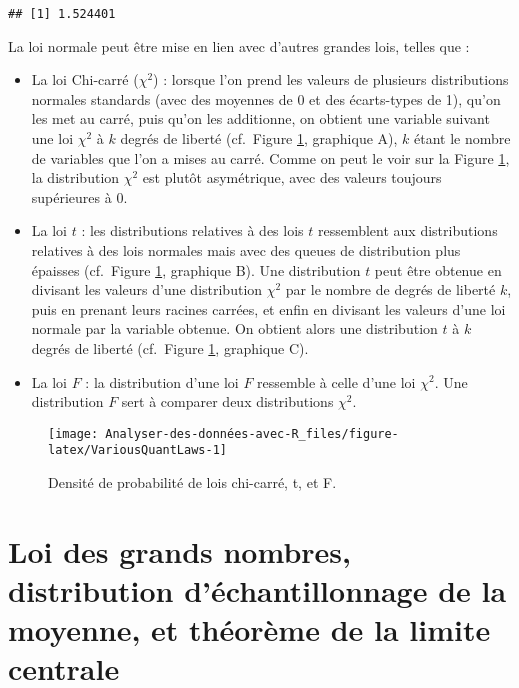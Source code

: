 \documentclass[
  french,
]{book}
\begin{document}
\begin{verbatim}
## [1] 1.524401
\end{verbatim}

La loi normale peut être mise en lien avec d'autres grandes lois, telles que :

\begin{itemize}
\item
  La loi Chi-carré (\(\chi^2\)) : lorsque l'on prend les valeurs de plusieurs distributions normales standards (avec des moyennes de 0 et des écarts-types de 1), qu'on les met au carré, puis qu'on les additionne, on obtient une variable suivant une loi \(\chi^2\) à \(k\) degrés de liberté (cf.~Figure \ref{fig:VariousQuantLaws}, graphique A), \(k\) étant le nombre de variables que l'on a mises au carré. Comme on peut le voir sur la Figure \ref{fig:VariousQuantLaws}, la distribution \(\chi^2\) est plutôt asymétrique, avec des valeurs toujours supérieures à 0.
\item
  La loi \(t\) : les distributions relatives à des lois \(t\) ressemblent aux distributions relatives à des lois normales mais avec des queues de distribution plus épaisses (cf.~Figure \ref{fig:VariousQuantLaws}, graphique B). Une distribution \(t\) peut être obtenue en divisant les valeurs d'une distribution \(\chi^2\) par le nombre de degrés de liberté \(k\), puis en prenant leurs racines carrées, et enfin en divisant les valeurs d'une loi normale par la variable obtenue. On obtient alors une distribution \(t\) à \(k\) degrés de liberté (cf.~Figure \ref{fig:VariousQuantLaws}, graphique C).
\item
  La loi \(F\) : la distribution d'une loi \(F\) ressemble à celle d'une loi \(\chi^2\). Une distribution \(F\) sert à comparer deux distributions \(\chi^2\).
\end{itemize}

\begin{figure}

{\centering \texttt{[image: Analyser-des-données-avec-R\_files/figure-latex/VariousQuantLaws-1]} 

}

\caption{Densité de probabilité de lois chi-carré, t, et F.}\label{fig:VariousQuantLaws}
\end{figure}

\hypertarget{loi-des-grands-nombres-distribution-duxe9chantillonnage-de-la-moyenne-et-thuxe9oruxe8me-de-la-limite-centrale}{%
\section{Loi des grands nombres, distribution d'échantillonnage de la moyenne, et théorème de la limite centrale}\label{loi-des-grands-nombres-distribution-duxe9chantillonnage-de-la-moyenne-et-thuxe9oruxe8me-de-la-limite-centrale}}
\end{document}
